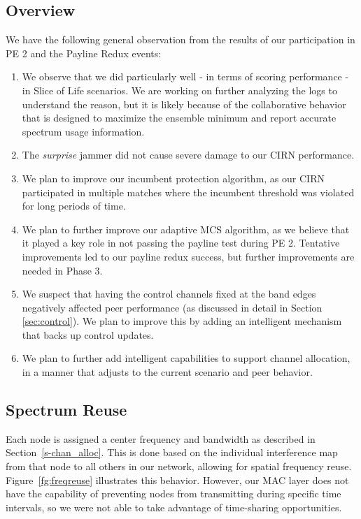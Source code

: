 \documentclass[11pt]{article}
\begin{document}
\subsection{Overview}
We have the following general observation from the results of our participation in PE 2 and the Payline Redux events:
\begin{enumerate}
    \item We observe that we did particularly well - in terms of scoring performance - in Slice of Life scenarios. We are working on further analyzing the logs to understand the reason, but it is likely because of the collaborative behavior that is designed to maximize the ensemble minimum and report accurate spectrum usage information.
    \item The \emph{surprise} jammer did not cause severe damage to our CIRN performance.
    \item We plan to improve our incumbent protection algorithm, as our CIRN participated in multiple matches where the incumbent threshold was violated for long periods of time.
    \item We plan to further improve our adaptive MCS algorithm, as we believe that it played a key role in not passing the payline test during PE 2. Tentative improvements led to our payline redux success, but further improvements are needed in Phase 3.
    \item We suspect that having the control channels fixed at the band edges negatively affected peer performance (as discussed in detail in Section \ref{sec:control}). We plan to improve this by adding an intelligent mechanism that backs up control updates.
    \item We plan to further add intelligent capabilities to support channel allocation, in a manner that adjusts to the current scenario and peer behavior.
\end{enumerate}
\subsection{Spectrum Reuse}

Each node is assigned a center frequency and bandwidth as described in Section~\ref{s-chan_alloc}. This is done based on the individual interference map from that node to all others in our network, allowing for spatial frequency reuse. Figure~\ref{fg:freqreuse} illustrates this behavior. However, our MAC layer does not have the capability of preventing nodes from transmitting during specific time intervals, so we were not able to take advantage of time-sharing opportunities. 
\end{document}
